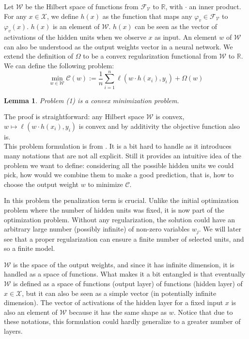 \documentclass[a4paper, 11pt]{scrartcl}
\newtheorem{lemma}[theorem]{Lemma}
\begin{document}
{Let $\mathcal{W}$ be the Hilbert space of functions from $\mathcal{F}_\mathcal{V}$ to $\mathbb{R}$, with $\cdot$ an inner product. For any $x \in \mathcal{X}$, we define $h(x)$ as the function that maps any $\varphi_v \in \mathcal{F}_\mathcal{V}$ to $\varphi_v(x)$. $h(x)$ is an element of $\mathcal{W}$. $h(x)$ can be seen as the vector of activations of the hidden units when we observe $x$ as input. An element $w$ of $\mathcal{W}$ can also be understood as the output weights vector in a neural network. We extend the definition of $\Omega$ to be a convex regularization functional from $\mathcal{W}$ to $\mathbb{R}$.  \\

We can define the following problem:
\begin{equation}
\min_{w \in \mathcal{W}} \mathcal{C}(w) := \frac{1}{n} \sum_{i=1}^n \ell(w \cdot h(x_i), y_i) + \Omega(w)
\end{equation}

\begin{lemma}
Problem (1) is a convex minimization problem.
\end{lemma}
The proof is straightforward: any Hilbert space $\mathcal{W}$ is convex, $w \mapsto \ell(w \cdot h(x_i), y_i)$ is convex and by additivity the objective function also is.\\

This problem formulation is from \cite{bengio2006convex}. It is a bit hard to handle as it introduces many notations that are not all explicit. Still it provides an intuitive idea of the problem we want to define: considering all the possible hidden units we could pick, how would we combine them to make a good prediction, that is, how to choose the output weight $w$ to minimize $\mathcal{C}$. 

In this problem the penalization term is crucial. Unlike the initial optimization problem where the number of hidden units was fixed, it is now part of the optimization problem. Without any regularization, the solution could have an arbitrary large number (possibly infinite) of non-zero variables $w_j$. We will later see that a proper regularization can ensure a finite number of selected units, and so a finite model.

$\mathcal{W}$ is the space of the output weights, and since it has infinite dimension, it is handled as a space of functions. What makes it a bit entangled is that eventually $\mathcal{W}$ is defined as a space of functions (output layer) of functions (hidden layer) of $x\in \mathcal{X}$, but it can also be seen as a simple vector (in potentially infinite dimension). The vector of activations of the hidden layer for a fixed input $x$ is also an element of $\mathcal{W}$ because it has the same shape as $w$. Notice that due to these notations, this formulation could hardly  generalize to a greater number of layers.\\

}
\end{document}
